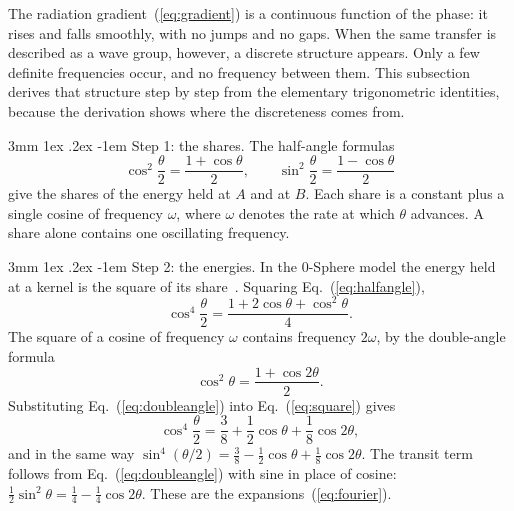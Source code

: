 \documentclass[%
 reprint, amsmath,amssymb, aps, prb, ]{revtex4-2}
\makeatletter
\numberwithin{equation}{section}
\renewcommand\paragraph{%
  \@startsection{paragraph}{4}{\z@}%
    {3mm \@plus 1ex \@minus .2ex}%
    {-1em}%
    {\normalfont\normalsize\itshape}}
\makeatother
\begin{document}
The radiation gradient~(\ref{eq:gradient}) is a continuous function of the phase: it rises and falls smoothly, with no jumps and no gaps. When the same transfer is described as a wave group, however, a discrete structure appears. Only a few definite frequencies occur, and no frequency between them. This subsection derives that structure step by step from the elementary trigonometric identities, because the derivation shows where the discreteness comes from.

\paragraph{Step 1: the shares.} The half-angle formulas
\begin{equation}
\cos^2\frac{\theta}{2} = \frac{1 + \cos\theta}{2}, \qquad \sin^2\frac{\theta}{2} = \frac{1 - \cos\theta}{2}
\label{eq:halfangle}
\end{equation}
give the shares of the energy held at $A$ and at $B$. Each share is a constant plus a single cosine of frequency $\omega$, where $\omega$ denotes the rate at which $\theta$ advances. A share alone contains one oscillating frequency.

\paragraph{Step 2: the energies.} In the 0-Sphere model the energy held at a kernel is the square of its share~\cite{H65}. Squaring Eq.~(\ref{eq:halfangle}),
\begin{equation}
\cos^4\frac{\theta}{2} = \frac{1 + 2\cos\theta + \cos^2\theta}{4}.
\label{eq:square}
\end{equation}
The square of a cosine of frequency $\omega$ contains frequency $2\omega$, by the double-angle formula
\begin{equation}
\cos^2\theta = \frac{1 + \cos2\theta}{2}.
\label{eq:doubleangle}
\end{equation}
Substituting Eq.~(\ref{eq:doubleangle}) into Eq.~(\ref{eq:square}) gives
\begin{equation}
\cos^4\frac{\theta}{2} = \frac38 + \frac12\cos\theta + \frac18\cos2\theta,
\label{eq:TAfourier}
\end{equation}
and in the same way $\sin^4(\theta/2) = \tfrac38 - \tfrac12\cos\theta + \tfrac18\cos2\theta$. The transit term follows from Eq.~(\ref{eq:doubleangle}) with sine in place of cosine: $\tfrac12\sin^2\theta = \tfrac14 - \tfrac14\cos2\theta$. These are the expansions~(\ref{eq:fourier}).
\end{document}
